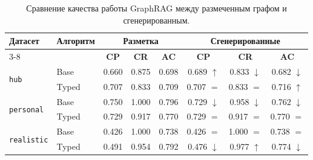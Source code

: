 \begin{table}[H]
    \caption{Сравнение качества работы GraphRAG между размеченным графом и сгенерированным.}
    \label{tab:exp3_vs_exp5}
    \centering
    \begin{tabular}{llccc|ccc}
        \hline
        \multirow{2}{*}{\textbf{Датасет}}   & \multirow{2}{*}{\textbf{Алгоритм}} & \multicolumn{3}{c|}{\textbf{Разметка}} & \multicolumn{3}{c}{\textbf{Сгенерированные}}                                                                               \\
        \cline{3-8}
                                            &                                    & \textbf{CP}                            & \textbf{CR}                                  & \textbf{AC} & \textbf{CP}        & \textbf{CR}        & \textbf{AC}         \\
        \hline
        \multirow{2}{*}{\texttt{hub}}       & Base                               & 0.660                                  & 0.875                                        & 0.698       & 0.689 $\uparrow$   & 0.833 $\downarrow$ & 0.682 $\downarrow$  \\
                                            & Typed                              & 0.707                                  & 0.833                                        & 0.709       & 0.707 $=$          & 0.833 $=$          & 0.716 $\uparrow$    \\
        \hline
        \multirow{2}{*}{\texttt{personal}}  & Base                               & 0.750                                  & 1.000                                        & 0.796       & 0.729 $\downarrow$ & 0.958 $\downarrow$ & 0.762 $\downarrow$  \\
                                            & Typed                              & 0.729                                  & 0.917                                        & 0.770       & 0.729 $=$          & 0.917 $=$          & 0.770 $=$           \\
        \hline
        \multirow{2}{*}{\texttt{realistic}} & Base                               & 0.426                                  & 1.000                                        & 0.738       & 0.426 $=$          & 1.000 $=$          & 0.738 $=$           \\
                                            & Typed                              & 0.491                                  & 0.954                                        & 0.792       & 0.476 $\downarrow$ & 0.977 $\uparrow$   & 0.774 $\downarrow$  \\

\end{tabular}
\end{table}
